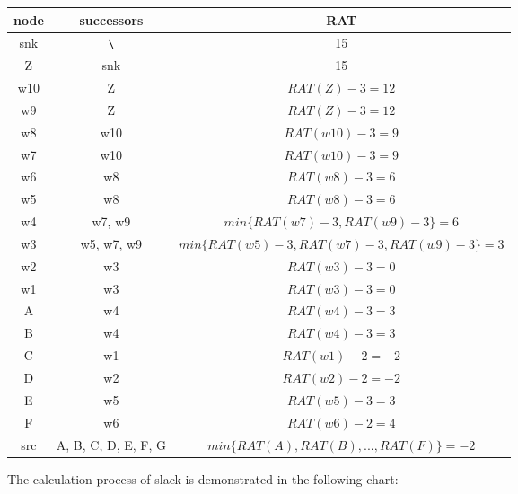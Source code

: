\documentclass[12pt]{article}
\begin{document}
    \begin{tabular}{|c|c|c|}
        \hline
        node & successors & RAT \\
        \hline
        snk & $\verb|\|$ & 15 \\
        \hline
        Z & snk & 15 \\
        \hline
        w10 & Z & $RAT(Z)-3=12$ \\
        \hline
        w9 & Z & $RAT(Z)-3=12$ \\
        \hline
        w8 & w10 & $RAT(w10)-3=9$ \\
        \hline
        w7 & w10 & $RAT(w10)-3=9$ \\
        \hline
        w6 & w8 & $RAT(w8)-3=6$ \\
        \hline
        w5 & w8 & $RAT(w8)-3=6$ \\
        \hline
        w4 & w7, w9 & $min\{RAT(w7)-3,RAT(w9)-3\}=6$ \\
        \hline
        w3 & w5, w7, w9 & $min\{RAT(w5)-3,RAT(w7)-3,RAT(w9)-3\}=3$ \\
        \hline
        w2 & w3 & $RAT(w3)-3=0$ \\
        \hline
        w1 & w3 & $RAT(w3)-3=0$ \\
        \hline
        A & w4 & $RAT(w4)-3=3$ \\
        \hline
        B & w4 & $RAT(w4)-3=3$ \\
        \hline
        C & w1 & $RAT(w1)-2=-2$ \\
        \hline
        D & w2 & $RAT(w2)-2=-2$ \\
        \hline
        E & w5 & $RAT(w5)-3=3$ \\
        \hline
        F & w6 & $RAT(w6)-2=4$ \\
        \hline
        src & A, B, C, D, E, F, G & $min\{RAT(A),RAT(B),...,RAT(F)\}=-2$ \\
        \hline
    \end{tabular}

    \vspace{12pt}

    The calculation process of slack is demonstrated in the following chart:
\end{document}
